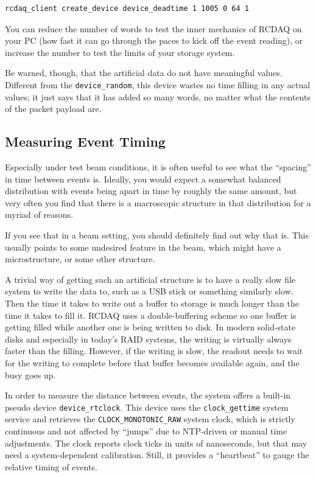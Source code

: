 \documentclass{article}[11pt]
\begin{document}
\begin{verbatim}
rcdaq_client create_device device_deadtime 1 1005 0 64 1
\end{verbatim}

You can reduce the number of words to test the inner mechanics of
RCDAQ on your PC (how fast it can go through the paces to kick off the
event reading), or increase the number to test the limits of your
storage system. 

Be warned, though, that the artificial data do not have meaningful
values. Different from the \verb|device_random|, this device wastes
no time filling in any actual values; it just says that it has added
so many words, no matter what the contents of the packet payload are.

\subsection{Measuring Event Timing}
\label{eventtiming}

Especially under test beam conditions, it is often useful to see what
the ``spacing'' in time between events is. Ideally, you would expect a
somewhat balanced distribution with events being apart in time by
roughly the same amount, but very often you find that there is a
macroscopic structure in that distribution for a myriad of reasons.

If you see that in a beam setting, you should definitely find out why
that is. This usually points to some undesired feature in the beam,
which might have a microstructure, or some other structure. 

A trivial way of getting such an artificial structure is to have a
really slow file system to write the data to, such as a USB stick or
something similarly slow. Then the time it takes to write out a buffer to
storage is much longer than the time it takes to fill it. RCDAQ uses a
double-buffering scheme so one buffer is getting filled while 
another one is being written to disk. In modern solid-state disks and
especially in today's RAID systems, the writing is virtually always
faster than the filling. However, if the writing is slow, the readout
needs to wait for the writing to complete before that buffer becomes
available again, and the busy goes up.

In order to measure the distance between events, the system offers a
built-in pseudo device \verb|device_rtclock|. This device uses the
\verb|clock_gettime| system service and retrieves the
\verb|CLOCK_MONOTONIC_RAW| system clock, which is strictly continuous
and not affected by ``jumps'' due to NTP-driven or manual time
adjustments. The clock reports clock ticks in units of nanoseconds,
but that may need a system-dependent calibration. Still, it provides a
``heartbeat'' to gauge the relative timing of events. 
\end{document}
